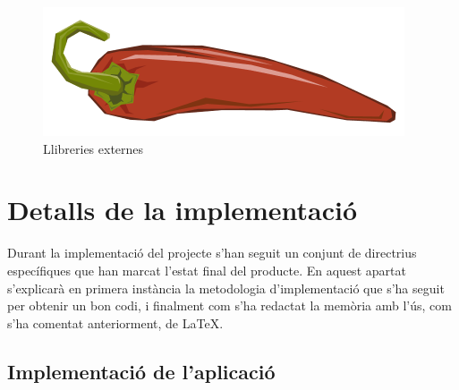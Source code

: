 \begin{figure}[H]
\includegraphics[scale=0.25]{Figures/lombok.png}
\caption{Llibreries externes}
\end{figure}


\clearpage
\section{Detalls de la implementació}

Durant la implementació del projecte s'han seguit un conjunt de directrius específiques que han marcat l'estat final del producte. En aquest apartat s'explicarà en primera instància la metodologia d'implementació que s'ha seguit per obtenir un bon codi, i finalment com s'ha redactat la memòria amb l'ús, com s'ha comentat anteriorment, de \LaTeX.

\subsection{Implementació de l'aplicació}

